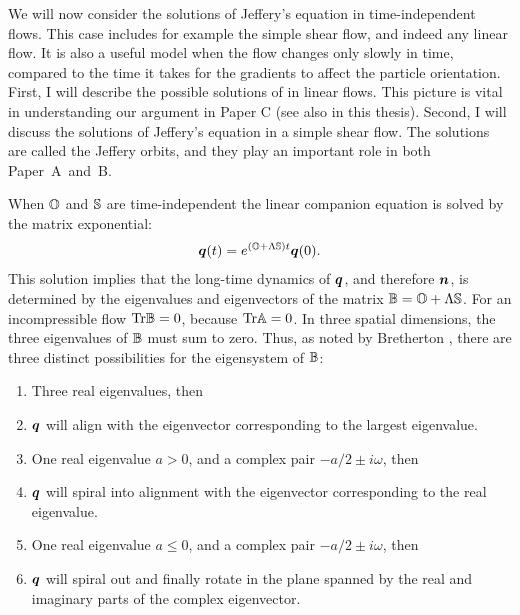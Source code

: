\documentclass[thesis.tex]{subfiles}
\begin{document}
We will now consider the solutions of Jeffery's equation in time-independent flows. This case includes for example the simple shear flow, and indeed any linear flow. It is also a useful model when the flow changes only slowly in time, compared to the time it takes for the gradients to affect the particle orientation. First, I will describe the possible solutions of  in linear flows. This picture is vital in understanding our argument in Paper C (see also  in this thesis). Second, I will discuss the solutions of Jeffery's equation in a simple shear flow. The solutions are called the Jeffery orbits, and they play an important role in both Paper~A~and~B.

When $\mathbb{O}$ and $\mathbb{S}$ are time-independent the linear companion equation  is solved by the matrix exponential:
\begin{align*}
		\mbox{\boldmath$q$}(t) = e^{(\mathbb{O} + \Lambda \mathbb{S})t}\mbox{\boldmath$q$}(0).
\end{align*}
This solution implies that the long-time dynamics of $\mbox{\boldmath$q$}$, and therefore $\mbox{\boldmath$n$}$, is determined by the eigenvalues and eigenvectors of the matrix $\mathbb{B} = \mathbb{O} + \Lambda\mathbb{S}$. For an incompressible flow $\mbox{Tr}\mathbb{B}=0$, because $\mbox{Tr}\mathbb{A}=0$. In three spatial dimensions, the three eigenvalues of $\mathbb{B}$ must sum to zero. Thus, as noted by Bretherton \cite{bretherton1962}, there are three distinct possibilities for the eigensystem of $\mathbb{B}$:
\begin{enumerate}
	\item Three real eigenvalues, then
	\item[] $\mbox{\boldmath$q$}$ will align with the eigenvector corresponding to the largest eigenvalue.
	\item One real eigenvalue $a>0$, and a complex pair $-a/2 \pm i\omega$, then
	\item[] $\mbox{\boldmath$q$}$ will spiral into alignment with the eigenvector corresponding to the real eigenvalue.
	\item One real eigenvalue $a\leq0$, and a complex pair $-a/2 \pm i\omega$, then
	\item[] $\mbox{\boldmath$q$}$ will spiral out and finally rotate in the plane spanned by the real and imaginary parts of the complex eigenvector.
\end{enumerate}
\end{document}

